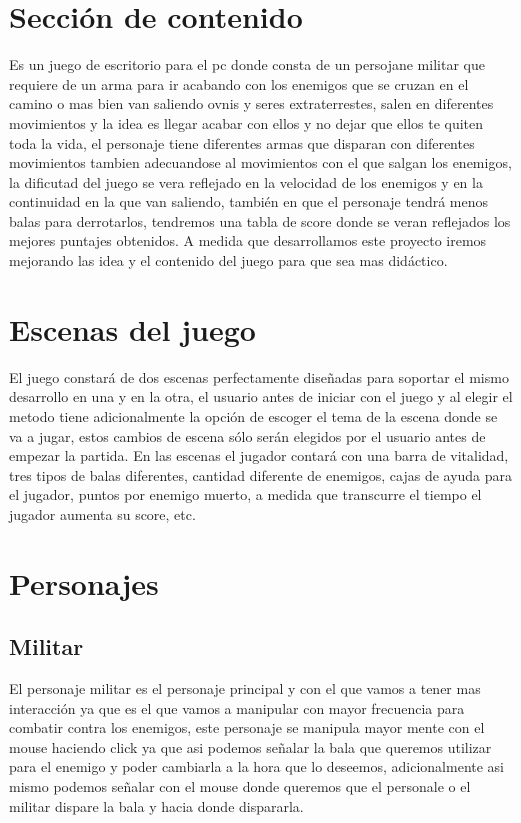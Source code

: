 \documentclass{article}
\begin{document}
\section{Sección de contenido} \label{contenido}
Es un juego de escritorio para el pc donde consta de un persojane militar que requiere de un arma para ir acabando con los enemigos que se cruzan en el camino o mas bien van saliendo ovnis y seres extraterrestes, salen en diferentes movimientos y la idea es llegar acabar con ellos y no dejar que ellos te quiten toda la vida, el personaje tiene diferentes armas que disparan con diferentes movimientos tambien adecuandose al movimientos con el que salgan los enemigos, la dificutad del juego se vera reflejado en la velocidad de los enemigos y en la continuidad en la que van saliendo, también en que el personaje tendrá menos balas para derrotarlos, tendremos una tabla de score donde se veran reflejados los mejores puntajes obtenidos. A medida que desarrollamos este proyecto iremos mejorando las idea y el contenido del juego para que sea mas didáctico.

\section{Escenas del juego} \label{contenido}
El juego constará de dos escenas perfectamente diseñadas para soportar el mismo desarrollo en una y en la otra, el usuario antes de iniciar con el juego y al elegir el metodo tiene adicionalmente la opción de escoger el tema de la escena donde se va a jugar, estos cambios de escena sólo serán elegidos por el usuario antes de empezar la partida. En las escenas el jugador contará con una barra de vitalidad, tres tipos de balas diferentes, cantidad diferente de enemigos, cajas de ayuda para el jugador, puntos por enemigo muerto, a medida que transcurre el tiempo el jugador aumenta su score, etc.

\section{Personajes} \label{contenido}
\subsection{Militar} \label{contenido}
El personaje militar es el personaje principal y con el que vamos a tener mas interacción ya que es el que vamos a manipular con mayor frecuencia para combatir contra los enemigos, este personaje se manipula mayor mente con el mouse haciendo click ya que asi podemos señalar la bala que queremos utilizar para el enemigo y poder cambiarla a la hora que lo deseemos, adicionalmente asi mismo podemos señalar con el mouse donde queremos que el personale o el militar dispare la bala y hacia donde dispararla.
\end{document}
